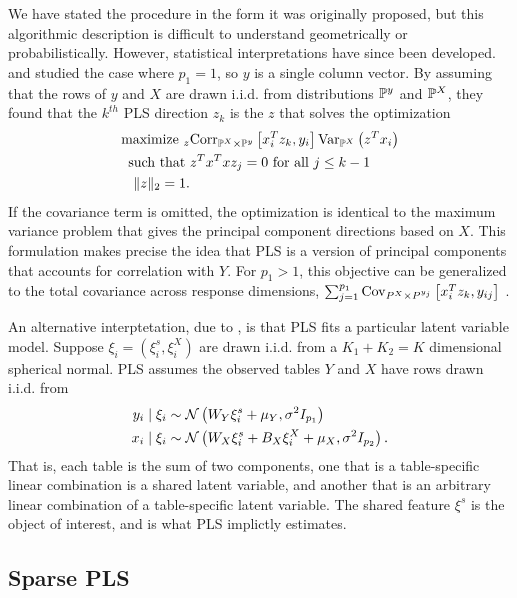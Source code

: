 \documentclass{article}
\begin{document}
We have stated the procedure in the form it was originally proposed, but this
algorithmic description is difficult to understand geometrically or
probabilistically. However, statistical interpretations have since been
developed. \citep{frank1993statistical} and \citep{stone1990continuum} studied
the case where $p_{1} = 1$, so $y$ is a single column vector. By assuming that
the rows of $y$ and $X$ are drawn i.i.d. from distributions $\P^{y}$ and
$\P^{X}$, they found that the $k^{th}$ PLS direction $z_{k}$ is the $z$ that
solves the optimization
\begin{align}
  \label{eq:pls_obj}
\text{maximize }_{z} & \Corrsubarg{\P^{X} \times \P^{y}}{x_{i}^{T}z_{k},
y_{i}}\Varsubarg{\P^{X}}{z^{T}x_i} \\
\text{such that }&z^{T}x^{T}x z_{j} = 0 \text{ for all }j \nonumber
\leq k - 1 \nonumber \\
\|z\|_2 = 1. \nonumber
\end{align}
If the covariance term is omitted, the optimization is identical to the maximum
variance problem that gives the principal component directions based on $X$.
This formulation makes precise the idea that PLS is a version of principal
components that accounts for correlation with $Y$. For $p_1 > 1$, this objective
can be generalized to the total covariance across response dimensions, $\sum_{j
  = 1}^{p_1} \Covsubarg{P^X \times P^{y_j}}{x_i^T z_k, y_{ij}}$
\citep{chun2010sparse}.

An alternative interptetation, due to \citep{gustafsson2001probabilistic}, is
that PLS fits a particular latent variable model. Suppose $\xi_{i} =
\left(\xi_{i}^{s}, \xi_{i}^{X}\right)$ are drawn i.i.d. from a $K_{1} + K_{2} =
K$ dimensional spherical normal. PLS assumes the observed tables $Y$ and $X$
have rows drawn i.i.d. from
\begin{align*}
y_{i} \mid \xi_{i} &\sim \Gsn\left(W_{Y}\xi_{i}^{s} +
\mu_{Y}, \sigma^{2}I_{p_{1}}\right) \\
x_{i} \mid \xi_{i} &\sim \Gsn\left(W_{X} \xi_{i}^{s} + B_{X}\xi_{i}^{X} +
\mu_{X}, \sigma^{2}I_{p_{2}}\right).
\end{align*}
That is, each table is the sum of two components, one that is a
table-specific linear combination is a shared latent variable, and
another that is an arbitrary linear combination of a table-specific
latent variable. The shared feature $\xi^{s}$ is the object of
interest, and is what PLS implictly estimates.

\subsection{Sparse PLS}
\label{subsec:spls}
\end{document}
